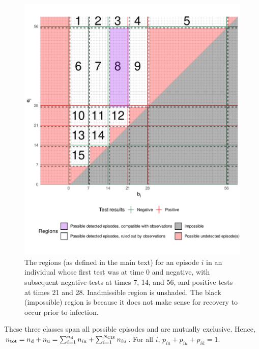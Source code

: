 \documentclass[thesis.tex]{subfiles}
\begin{document}
\begin{figure}
\includegraphics[width=\textwidth]{cis-perfect-testing/regions_diag}
\caption[Admissible, inadmissible, and undetected infections]{The regions (as defined in the main text) for an episode $i$ in an
individual whose first test was at time 0 and negative, with subsequent
negative tests at times 7, 14, and 56, and positive tests at times 21
and 28. Inadmissible region is unshaded. The black (impossible) region is because it does not make sense for recovery to occur prior to infection. \label{perf-test:fig:partitionSpace}}
\end{figure}

These three classes span all possible episodes and are mutually exclusive.
Hence, $n_\text{tot} = n_\text{d} + n_\text{u} = \sum_{i=1}^{n_\text{d}} n_{ia} + \sum_{i=1}^{N_\text{CIS}} n_{iu}$.
For all $i$, $p_{ia} + p_{iu} + p_{i\bar{a}} = 1$.
\end{document}
